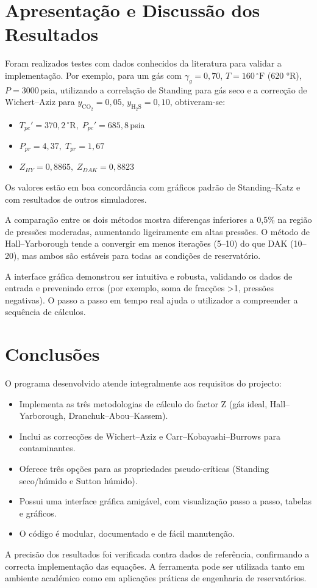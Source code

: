 \documentclass[a4paper,12pt]{article}
\begin{document}
\section{Apresentação e Discussão dos Resultados}
Foram realizados testes com dados conhecidos da literatura para validar a implementação. Por exemplo, para um gás com \(\gamma_g=0{,}70\), \(T=160\,^\circ\text{F}\) (620 °R), \(P=3000\,\)psia, utilizando a correlação de Standing para gás seco e a correcção de Wichert–Aziz para \(y_{\mathrm{CO}_2}=0{,}05\), \(y_{\mathrm{H}_2\mathrm{S}}=0{,}10\), obtiveram-se:
\begin{itemize}
    \item \(T_{pc}' = 370{,}2\,^\circ\text{R},\; P_{pc}' = 685{,}8\,\)psia
    \item \(P_{pr}=4{,}37,\; T_{pr}=1{,}67\)
    \item \(Z_{HY}=0{,}8865,\; Z_{DAK}=0{,}8823\)
\end{itemize}
Os valores estão em boa concordância com gráficos padrão de Standing–Katz e com resultados de outros simuladores.

A comparação entre os dois métodos mostra diferenças inferiores a 0,5\% na região de pressões moderadas, aumentando ligeiramente em altas pressões. O método de Hall–Yarborough tende a convergir em menos iterações (5–10) do que DAK (10–20), mas ambos são estáveis para todas as condições de reservatório.

A interface gráfica demonstrou ser intuitiva e robusta, validando os dados de entrada e prevenindo erros (por exemplo, soma de fracções >1, pressões negativas). O passo a passo em tempo real ajuda o utilizador a compreender a sequência de cálculos.

\section{Conclusões}
O programa desenvolvido atende integralmente aos requisitos do projecto:
\begin{itemize}
    \item Implementa as três metodologias de cálculo do factor Z (gás ideal, Hall–Yarborough, Dranchuk–Abou–Kassem).
    \item Inclui as correcções de Wichert–Aziz e Carr–Kobayashi–Burrows para contaminantes.
    \item Oferece três opções para as propriedades pseudo-críticas (Standing seco/húmido e Sutton húmido).
    \item Possui uma interface gráfica amigável, com visualização passo a passo, tabelas e gráficos.
    \item O código é modular, documentado e de fácil manutenção.
\end{itemize}
A precisão dos resultados foi verificada contra dados de referência, confirmando a correcta implementação das equações. A ferramenta pode ser utilizada tanto em ambiente académico como em aplicações práticas de engenharia de reservatórios.
\end{document}
